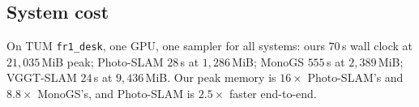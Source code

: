 \subsection{System cost}
\label{sec:exp:cost}
On TUM \texttt{fr1\_desk}, one GPU, one sampler for all systems: ours
$70$\,s wall clock at $21{,}035$\,MiB peak; Photo-SLAM $28$\,s at
$1{,}286$\,MiB; MonoGS $555$\,s at $2{,}389$\,MiB; VGGT-SLAM $24$\,s at
$9{,}436$\,MiB. Our peak memory is $16\times$ Photo-SLAM's and $8.8\times$
MonoGS's, and Photo-SLAM is $2.5\times$ faster end-to-end.
